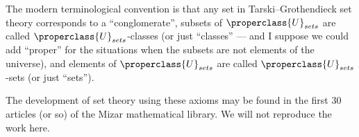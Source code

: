 \begin{node}
\begin{definition}
\begin{node}[Remarks]
The modern terminological convention is that any set in
Tarski--Grothendieck set theory corresponds to a ``conglomerate'',
subsets of $\properclass{U}_{sets}$ are called
$\properclass{U}_{sets}$-classes (or just ``classes'' --- and I suppose
we could add ``proper'' for the situations when the subsets are not
elements of the universe), and elements of
$\properclass{U}_{sets}$ are called $\properclass{U}_{sets}$-sets (or
just ``sets'').
\end{node}
\end{definition}
\end{node}

\begin{node}\label{tg-000A}%
The development of set theory using these axioms may be found in the
first 30 articles (or so) of the Mizar mathematical library. We will not
reproduce the work here.
\end{node}
